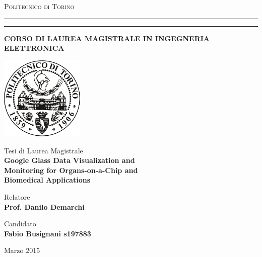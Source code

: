 

\begin{titlepage}
\begin{center}
 


{{\Large{\textsc{Politecnico di Torino}}}} 
\rule[0.1cm]{\textwidth}{0.1mm}
\rule[0.5cm]{\textwidth}{0.6mm}

{\small{\bf CORSO DI LAUREA MAGISTRALE IN INGEGNERIA ELETTRONICA}}
\end{center}
\vspace{5mm}
\begin{center}
	\includegraphics[width=0.3\textwidth]{./Frontespizio/logo_polito}\\[1cm] 
\end{center}


\vspace{10mm}

\begin{center}
	 {\large{Tesi di Laurea Magistrale}}\\
	 \vspace{5mm}
{\LARGE{\bf Google Glass Data Visualization and}}\\
\vspace{1mm}
	{\LARGE{\bf Monitoring for Organs-on-a-Chip and}}\\
	\vspace{1mm}
	{\LARGE{\bf Biomedical Applications}} \\ 

\vspace{15mm}
\end{center}
{\large
	Relatore\\
		{
			\bf 
			 Prof. Danilo Demarchi\\ 
			
		}
}
\begin{flushright}
	{\large
		Candidato\\
		{
			\bf 
			Fabio Busignani s197883\\ 
			
		}
	}

\end{flushright}

\vfill
\begin{center}
{\large Marzo 2015}
\end{center}


\end{titlepage}